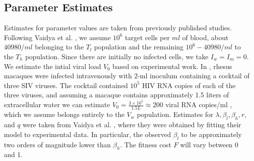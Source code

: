 \documentclass[11pt, oneside]{article}    %
\begin{document}




\subsection{Parameter Estimates}

	Estimates for parameter values are taken from previously published studies. Following Vaidya et al. \cite{Vaidya}, we assume $10^6$ target cells per $ml$ of blood,  about $40980/ml$ belonging to the $T_l$ population and the remaining $10^6 - 40980/ml$ to the $T_h$ population. Since there are initially no infected cells, we take $I_w=I_m = 0$. We estimate the intial viral load $V_0$ based on experimental work. In \cite{Kumar}, rhesus macaques were infected intravenously with 2-ml inoculum containing a cocktail of three SIV viruses. The cocktail contained $10^5$ HIV RNA copies of each of the three viruses, and assuming a macaque contains approximately 1.5 liters of extracellular water we can estimate $V_0 = \frac{3\times 10^5 }{1.5 L} \approx 200$ viral RNA copies/ml \cite{Vaidya}, which we assume belongs entirely to the $V_w$ population. Estimates for $\lambda, \beta_l, \beta_h, r$, and $q$ were taken from Vaidya et al. \cite{Vaidya}, where they were obtained by fitting their model to experimental data. In particular, the observed $\beta_l$ to be approximately two orders of magnitude lower than $\beta_h$. The fitness cost $F$ will vary between 0 and 1.
\end{document}
